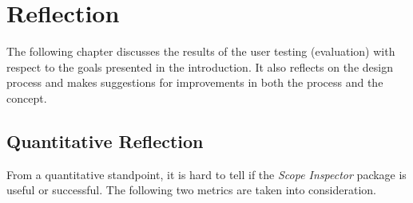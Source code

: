 \chapter{Reflection}\label{reflection}

The following chapter discusses the results of the user testing
(evaluation) with respect to the goals presented in the introduction. It
also reflects on the design process and makes suggestions for
improvements in both the process and the concept.

\section{Quantitative Reflection}\label{quantitative-reflection}

From a quantitative standpoint, it is hard to tell if the \emph{Scope
Inspector} package is useful or successful. The following two metrics
are taken into consideration.

